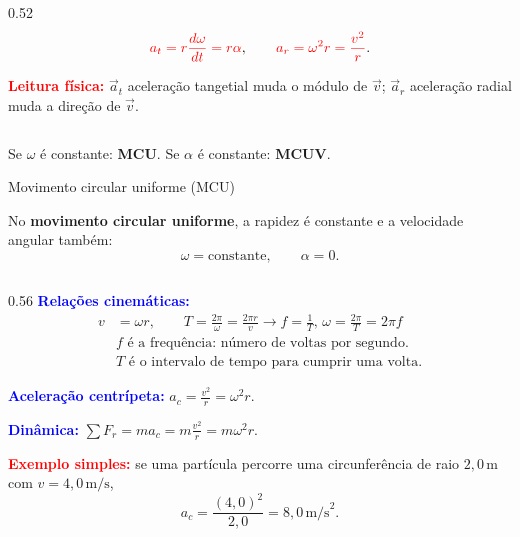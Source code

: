\documentclass{beamer}
\begin{document}
\begin{frame}{}
\begin{columns}[T]
\begin{column}{0.52\textwidth}
				\[
				\textcolor{red}{a_t= r \frac{d \omega}{dt}=r\alpha},
				\qquad
				\textcolor{red}{a_r=\omega^2r=\frac{v^2}{r}}.
				\]
				
				\textcolor{red}{\textbf{Leitura física:}}  
				\(\vec a_t\) aceleração tangetial muda o módulo de \(\vec v\);  
				\(\vec a_r\) aceleração radial muda a direção de \(\vec v\).
			\end{column}
		\end{columns}
		
		\vspace{0.2cm}
		\centering
		Se \(\omega\) é constante: \textbf{MCU}. \qquad
		Se \(\alpha\) é constante: \textbf{MCUV}.
		
	\end{frame}
	
	
	\begin{frame}{Movimento circular uniforme (MCU)}
		\scriptsize
		
		No \textbf{movimento circular uniforme}, a rapidez é constante e a velocidade angular também:
		\[
		\omega=\text{constante}, \qquad \alpha=0.
		\]
		
		\begin{columns}[T,onlytextwidth]
			\begin{column}{0.56\textwidth}
				\textcolor{blue}{\textbf{Relações cinemáticas:}}
				\begin{align*}
					v &= \omega r, \qquad
					T = \frac{2\pi}{\omega}=\frac{2\pi r}{v} \rightarrow
					f = \frac{1}{T},\, \omega= \frac{2\pi}{T}= 2\pi f\\[0.1cm]
					&\text{\(f\) é a frequência: número de voltas por segundo.}\\ 
					&\text{\(T\) é o intervalo de tempo para cumprir uma volta.} 
				\end{align*}
				
				\textcolor{blue}{\textbf{Aceleração centrípeta:}}
				$
				a_c=\frac{v^2}{r}=\omega^2 r.
				$
				
				\vspace{0.2cm}
				
				\textcolor{blue}{\textbf{Dinâmica:}}
				$
				\sum F_r = m a_c = m\frac{v^2}{r}=m\omega^2 r.
				$
				
				\vspace{0.2cm}
				
				\textcolor{red}{\textbf{Exemplo simples:}} se uma partícula percorre uma circunferência de raio \(2,0\,\text{m}\) com \(v=4,0\,\text{m/s}\),
				\[
				a_c=\frac{(4,0)^2}{2,0}=8,0\,\text{m/s}^2.
				\]
			\end{column}
			

\end{columns}
\end{frame}
\end{document}
